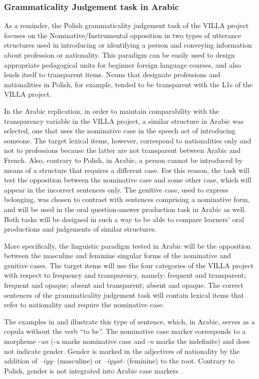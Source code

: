 \documentclass[output=paper,colorlinks,citecolor=brown,modfonts,nonflat]{../langscibook}
\begin{document}
\subsubsection{Grammaticality Judgement task in Arabic}\label{sec:watorek:4.2.1}

As a reminder, the Polish grammaticality judgement task of the VILLA project focuses on the Nominative/Instrumental opposition in two types of utterance structures used in introducing or identifying a person and conveying information about profession or nationality. This paradigm can be easily used to design appropriate pedagogical units for beginner foreign language courses, and also lends itself to transparent items. Nouns that designate professions and nationalities in Polish, for example, tended to be transparent with the L1s of the VILLA project. 

In the Arabic replication, in order to maintain comparability with the transparency variable in the VILLA project, a similar structure in Arabic was selected, one that uses the nominative case in the speech act of introducing someone. The target lexical items, however, correspond to nationalities only and not to professions because the latter are not transparent between Arabic and French. Also, contrary to Polish, in Arabic, a person cannot be introduced by means of a structure that requires a different case. For this reason, the task will test the opposition between the nominative case and some other case, which will appear in the incorrect sentences only. The genitive case, used to express belonging, was chosen to contrast with sentences comprising a nominative form, and will be used in the oral question-answer production task in Arabic as well. Both tasks will be designed in such a way to be able to compare learners’ oral productions and judgements of similar structures. 

More specifically, the linguistic paradigm tested in Arabic will be the opposition between the masculine and feminine singular forms of the nominative and genitive cases. The target items will use the four categories of the VILLA project with respect to frequency and transparency, namely: frequent and transparent; frequent and opaque; absent and transparent; absent and opaque. The correct sentences of the grammaticality judgement task will contain lexical items that refer to nationality and require the nominative case. 

The examples in  and  illustrate this type of sentence, which, in Arabic, serves as a copula without the verb “to be”. The nominative case marker corresponds to a morpheme -\textit{un} (-\textit{u} marks nominative case and -\textit{n} marks the indefinite) and does not indicate gender. Gender is marked in the adjectives of nationality by the addition of \textit{–iyy-} (masculine) or \textit{–iyyat-} (feminine) to the root. Contrary to Polish, gender is not integrated into Arabic case markers \citep{Kouloughli2007}.
\end{document}
